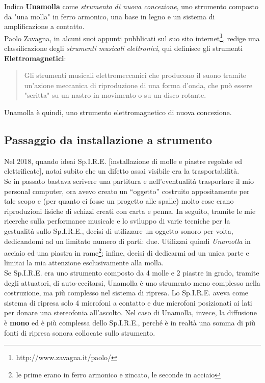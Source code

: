 Indico \textbf{Unamolla} come \textit{strumento di nuova concezione}, uno strumento composto da "una molla" in ferro armonico, una base in legno e un sistema di amplificazione a contatto. \\
Paolo Zavagna, in alcuni suoi appunti pubblicati sul suo sito internet\footnote{http://www.zavagna.it/paolo/}, redige una classificazione degli \textit{strumenti musicali elettronici}, qui definisce gli strumenti \textbf{Elettromagnetici}:

\begin{quotation}
Gli strumenti musicali elettromeccanici che producono il suono tramite un’azione meccanica di riproduzione di una forma d’onda, che può essere "scritta" su un nastro in movimento o su un disco rotante.\end{quotation}

Unamolla è quindi, uno strumento elettromagnetico di nuova concezione. \\

\subsection{Passaggio da installazione a strumento}

Nel 2018, quando ideai Sp.I.R.E. [installazione di molle e piastre regolate ed elettrificate], notai subito che un difetto assai visibile era la trasportabilità. \\
Se in passato bastava scrivere una partitura e nell’eventualità trasportare il mio personal computer, ora avevo creato un “oggetto” costruito appositamente per tale scopo e (per quanto ci fosse un progetto alle spalle) molto cose erano riproduzioni fisiche di schizzi creati con carta e penna. 
In seguito, tramite le mie ricerche sulla performance musicale e lo sviluppo di varie tecniche per la gestualità sullo Sp.I.R.E., decisi di utilizzare un oggetto sonoro per volta, dedicandomi ad un limitato numero di parti: due. Utilizzai quindi \textit{Unamolla} in acciaio ed una piastra in rame\footnote{le prime erano in ferro armonico e zincato, le seconde in acciaio}; infine, decisi di dedicarmi ad un unica parte e limitai la mia attenzione esclusivamente alla molla. \\
Se Sp.I.R.E. era uno strumento composto da 4 molle e 2 piastre in grado, tramite degli attuatori, di auto-eccitarsi, Unamolla è uno strumento meno complesso nella costruzione, ma più complesso nel sistema di ripresa. Lo Sp.I.R.E. aveva come sistema di ripresa solo 4 microfoni a contatto e due microfoni posizionati ai lati per donare una stereofonia all'ascolto. Nel caso di Unamolla, invece, la diffusione è \textbf{mono} ed è più complessa dello Sp.I.R.E., perché è in realtà una somma di più fonti di ripresa sonora collocate sullo strumento.

